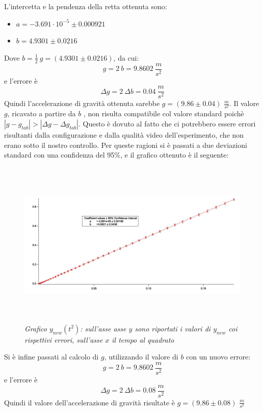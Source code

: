\documentclass[12pt, a4paper]{article}
\begin{document}
L'intercetta e la pendenza della retta ottenuta sono:
\begin{itemize}
    \item $a=-3.691\cdot 10^{-5}\pm 0.000921$
    \item$b=4.9301\pm 0.0216$
\end{itemize}
Dove $\displaystyle b=\frac{1}{2}\ g=(4.9301\pm 0.0216)$, da cui:
\begin{equation*}
    g=2 \ b=9.8602 \ \frac{m}{s^2}
\end{equation*}
e l'errore è
\begin{equation*}
    \Delta g=2\ \Delta b=0.04 \ \frac{m}{s^2}
\end{equation*}
Quindi l'accelerazione di gravità ottenuta sarebbe $g=(9.86\pm0.04)$ $\frac{m}{s^2}$.
Il valore $g$, ricavato a partire da $b$ , non risulta compatibile col valore standard poichè $|g-g_{tab}|> |\Delta g-\Delta g_{tab}|$. Questo è dovuto al fatto che ci potrebbero essere errori risultanti dalla configurazione e dalla qualità video dell'esperimento, che non erano sotto il nostro controllo. Per queste ragioni si è passati a due deviazioni standard con una confidenza del 95\%, e il grafico ottenuto è il seguente:
  \begin{figure}[h!]
\centering
\includegraphics[width=170mm, height=80mm]{Immagini/Graphy_t^2.jpg}
\caption{\textit{{\footnotesize{Grafico $y_{new}(t^2)$: sull'asse asse $y$ sono riportati i valori di $y_{new}$ coi rispettivi errori, sull'asse $x$ il tempo al quadrato}}}}
\label{Grafico logaritmico}
\end{figure}

Si è infine passati al calcolo di $g$, utilizzando il valore di $b$ con un nuovo errore:
\begin{equation*}
    g=2 \ b=9.8602\ \frac{m}{s^2}
\end{equation*}
e l'errore è
\begin{equation*}
    \Delta g=2\ \Delta b=0.08\ \frac{m}{s^2}
\end{equation*}
Quindi il valore dell'accelerazione di gravità risultate è $g=(9.86\pm0.08)$ $\frac{m}{s^2}$
\end{document}
